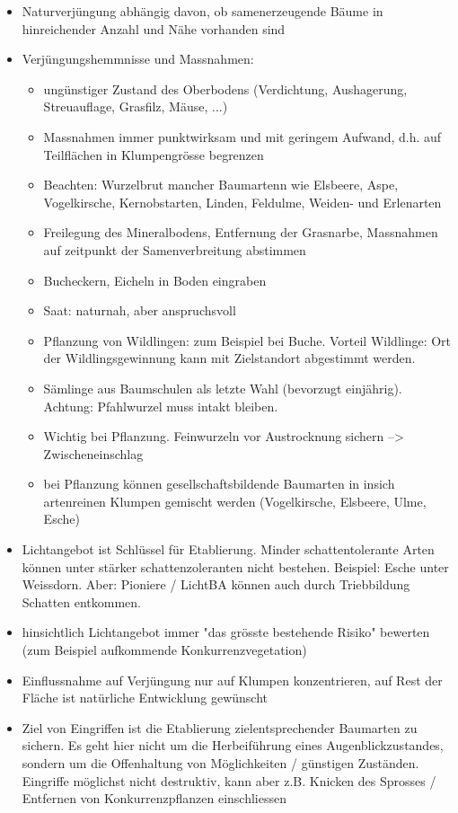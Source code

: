 \documentclass{article}
\begin{document}
\begin{itemize}
  \item Naturverjüngung abhängig davon, ob samenerzeugende Bäume in hinreichender Anzahl und Nähe vorhanden sind
  
  \item Verjüngungshemmnisse und Massnahmen:
  
    \begin{itemize}
       \item ungünstiger Zustand des Oberbodens (Verdichtung, Aushagerung, Streuauflage, Grasfilz, Mäuse, ...)
       \item Massnahmen immer punktwirksam und mit geringem Aufwand, d.h. auf Teilflächen in Klumpengrösse begrenzen
       \item Beachten: Wurzelbrut mancher Baumartenn wie Elsbeere, Aspe, Vogelkirsche, Kernobstarten, Linden, Feldulme, Weiden- und Erlenarten
       \item Freilegung des Mineralbodens, Entfernung der Grasnarbe, Massnahmen auf zeitpunkt der Samenverbreitung abstimmen
       \item Bucheckern, Eicheln in Boden eingraben
       \item Saat: naturnah, aber anspruchsvoll
       \item Pflanzung von Wildlingen: zum Beispiel bei Buche. Vorteil Wildlinge: Ort der Wildlingsgewinnung kann mit Zielstandort abgestimmt werden.
       \item Sämlinge aus Baumschulen als letzte Wahl (bevorzugt einjährig). Achtung: Pfahlwurzel muss intakt bleiben.
       \item Wichtig bei Pflanzung. Feinwurzeln vor Austrocknung sichern --> Zwischeneinschlag
       \item bei Pflanzung können gesellschaftsbildende Baumarten in insich artenreinen Klumpen gemischt werden (Vogelkirsche, Elsbeere, Ulme, Esche)
    \end{itemize}


   \item Lichtangebot ist Schlüssel für Etablierung. Minder schattentolerante Arten können unter stärker schattenzoleranten nicht bestehen. Beispiel: Esche unter Weissdorn. Aber: Pioniere / LichtBA können auch durch Triebbildung Schatten entkommen.
   
   \item hinsichtlich Lichtangebot immer "das grösste bestehende Risiko" bewerten (zum Beispiel aufkommende Konkurrenzvegetation)

   \item Einflussnahme auf Verjüngung nur auf Klumpen konzentrieren, auf Rest der Fläche ist natürliche Entwicklung gewünscht
   
   \item Ziel von Eingriffen ist die Etablierung zielentsprechender Baumarten zu sichern. Es geht hier nicht um die Herbeiführung eines Augenblickzustandes, sondern um die Offenhaltung von Möglichkeiten / günstigen Zuständen. Eingriffe möglichst nicht destruktiv, kann aber z.B. Knicken des Sprosses / Entfernen von Konkurrenzpflanzen einschliessen




   
\end{itemize} 
  
\end{document}
